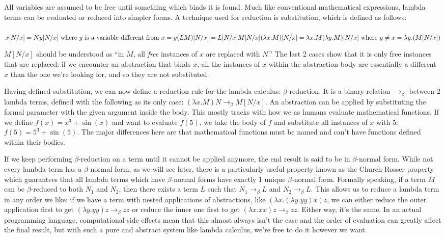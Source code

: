 \documentclass[12pt]{article}
\begin{document}
All variables are assumed to be free until something which binds it is found. Much like conventional mathematical expressions, lambda terms can be evaluated or reduced into simpler forms. A technique used for reduction is substitution, which is defined as follows: \\
\\
$x[N/x] = N \\
y[N/x] \text{ where $y$ is a variable different from $x$} = y \\
(L M)[N/x] = L[N/x] M[N/x] \\
(\lambda x. M)[N/x] = \lambda x. M \\
(\lambda y. M)[N/x] \text{ where $y \ne x$} = \lambda y. (M[N/x]) \\$

$M[N/x]$ should be understood as ``in $M$, all \textit{free} instances of $x$ are replaced with $N$.'' The last 2 cases show that it is only free instances that are replaced: if we encounter an abstraction that binds $x$, all the instances of $x$ within the abstraction body are essentially a different $x$ than the one we're looking for, and so they are not substituted.

Having defined substitution, we can now define a reduction rule for the lambda calculus: $\beta$-reduction. It is a binary relation $\to_\beta$ between 2 lambda terms, defined with the following as its only case: $(\lambda x. M)N \to_\beta M[N/x]$. An abstraction can be applied by substituting the formal parameter with the given argument inside the body. This mostly tracks with how we as humans evaluate mathematical functions. If we define $f(x) = x^3 + \sin(x)$ and want to evaluate $f(5)$, we take the body of $f$ and substitute all instances of $x$ with 5: $f(5) = 5^3 + \sin(5)$. The major differences here are that mathematical functions must be named and can't have functions defined within their bodies.

If we keep performing $\beta$-reduction on a term until it cannot be applied anymore, the end result is said to be in $\beta$-normal form. While not every lambda term has a $\beta$-normal form, as we will see later, there is a particularly useful property known as the Church-Rosser property which guarantees that all lambda terms which have $\beta$-normal forms have exactly 1 unique $\beta$-normal form. Formally speaking, if a term $M$ can be $\beta$-reduced to both $N_1$ and $N_2$, then there exists a term $L$ such that $N_1 \to_\beta L$ and $N_2 \to_\beta L$. This allows us to reduce a lambda term in any order we like: if we have a term with nested applications of abstractions, like $(\lambda x. (\lambda y. y y) x) z$, we can either reduce the outer application first to get $(\lambda y. y y) z \to_\beta zz$ or reduce the inner one first to get $(\lambda x. xx) z \to_\beta zz$. Either way, it's the same. In an actual programming language, computational side effects mean that this almost always isn't the case and the order of evaluation can greatly affect the final result, but with such a pure and abstract system like lambda calculus, we're free to do it however we want.
\end{document}
